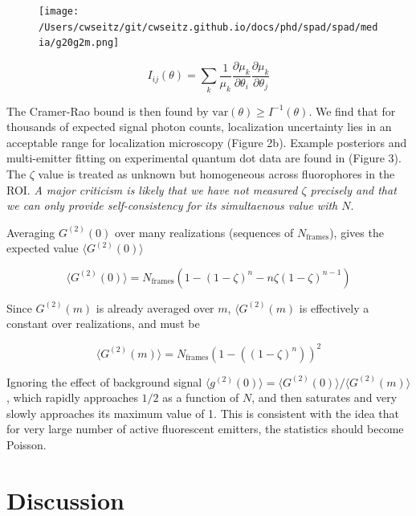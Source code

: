 \begin{figure}[t]
\centering
\texttt{[image: /Users/cwseitz/git/cwseitz.github.io/docs/phd/spad/spad/media/g20g2m.png]}
\caption{}
\end{figure}   

\begin{equation}
I_{ij}(\theta) = \sum_{k}\frac{1}{\mu_{k}}\frac{\partial \mu_{k}}{\partial\theta_{i}}\frac{\partial \mu_{k}}{\partial\theta_{j}}
\end{equation}

The Cramer-Rao bound is then found by $\mathrm{var}(\theta) \geq I^{-1}(\theta)$. We find that for thousands of expected signal photon counts, localization uncertainty lies in an acceptable range for localization microscopy (Figure 2b). Example posteriors and multi-emitter fitting on experimental quantum dot data are found in (Figure 3). The $\zeta$ value is treated as unknown but homogeneous across fluorophores in the ROI. \textit{A major criticism is likely that we have not measured $\zeta$ precisely and that we can only provide self-consistency for its simultaenous value with $N$}.

Averaging $G^{(2)}(0)$ over many realizations (sequences of $N_{\mathrm{frames}}$), gives the expected value $\langle G^{(2)}(0)\rangle $

\begin{equation}
\langle G^{(2)}(0)\rangle = N_{\mathrm{frames}}(1 - (1-\zeta)^n - n\zeta (1-\zeta)^{n-1})
\end{equation}

Since $G^{(2)}(m)$ is already averaged over $m$, $\langle G^{(2)}(m) $ is effectively a constant over realizations, and must be

\begin{equation}
\langle G^{(2)}(m)\rangle =  N_{\mathrm{frames}} \left(1 - \left((1-\zeta)^n\right)\right)^2
\end{equation}

Ignoring the effect of background signal $\langle g^{(2)}(0)\rangle =\langle G^{(2)}(0)\rangle/\langle G^{(2)}(m)\rangle$, which rapidly approaches $1/2$ as a function of $N$, and then saturates and very slowly approaches its maximum value of 1. This is consistent with the idea that for very large number of active fluorescent emitters, the statistics should become Poisson.



\section{Discussion}

